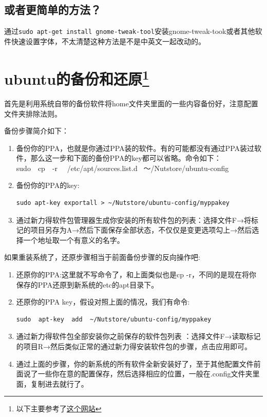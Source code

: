 \documentclass[11pt,oneside]{book}
\begin{document}
\subsection{或者更简单的方法？}
通过\verb+sudo apt-get install gnome-tweak-tool+安装gnome-tweak-took或者其他软件快速设置字体，不太清楚这种方法是不是中英文一起改动的。
 


\section[ubuntu的备份和还原]{ubuntu的备份和还原\footnote{以下主要参考了\href{http://www.matthartley.com/how-to-backup-your-ubuntu-software/}{这个网站}}}
首先是利用系统自带的备份软件将home文件夹里面的一些内容备份好，注意配置文件夹排除法则。

备份步骤简介如下：
\begin{enumerate}
\item 备份你的PPA，也就是你通过PPA装的软件。有的可能都没有通过PPA装过软件，那么这一步和下面的备份PPA的key都可以省略。命令如下：\\
sudo~~cp~~-r ~~/etc/apt/sources.list.d~ ～/Nutstore/ubuntu-config
\item 备份你的PPA的key:
\begin{Verbatim}
sudo apt-key exportall > ~/Nutstore/ubuntu-config/myppakey
\end{Verbatim}
\item 通过新力得软件包管理器生成你安装的所有软件包的列表：选择文件F→将标记的项目另存为A→然后下面保存全部状态，不仅仅是变更选项勾上→然后选择一个地址取一个有意义的名字。
\end{enumerate}

如果重装系统了，还原步骤相当于前面备份步骤的反向操作吧:
\begin{enumerate}
\item 还原你的PPA:这里就不写命令了，和上面类似也是cp   -r，不同的是现在将你保存的PPA还原到新系统的etc的apt目录下。
\item 还原你的PPA key，假设对照上面的情况，我们有命令:
\begin{Verbatim}
sudo  apt-key  add  ~/Nutstore/ubuntu-config/myppakey
\end{Verbatim}
\item 通过新力得软件包全部安装你之前保存的软件包列表 ：选择文件F→读取标记的项目R→然后类似正常的通过新力得安装软件包的步骤，点击应用即可。
\item 通过上面的步骤，你的新系统的所有软件全新安装好了，至于其他配置文件前面说了一些你在意的配置保存，然后选择相应的位置，一般在.config文件夹里面，复制进去就行了。
\end{enumerate}
\end{document}
